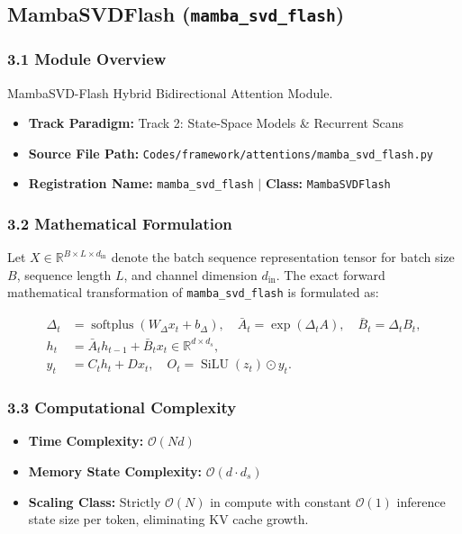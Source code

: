 \subsection{MambaSVDFlash (\texttt{mamba\_svd\_flash})}
\label{sec:app_module_mamba_svd_flash}

\subsubsection*{3.1 Module Overview}
MambaSVD-Flash Hybrid Bidirectional Attention Module.
\begin{itemize}
    \item \textbf{Track Paradigm:} Track 2: State-Space Models \& Recurrent Scans
    \item \textbf{Source File Path:} \texttt{Codes/framework/attentions/mamba\_svd\_flash.py}
    \item \textbf{Registration Name:} \texttt{mamba\_svd\_flash} $\mid$ \textbf{Class:} \texttt{MambaSVDFlash}
\end{itemize}

\subsubsection*{3.2 Mathematical Formulation}
Let $X \in \mathbb{R}^{B \times L \times d_{\text{in}}}$ denote the batch sequence representation tensor for batch size $B$, sequence length $L$, and channel dimension $d_{\text{in}}$. The exact forward mathematical transformation of \texttt{mamba\_svd\_flash} is formulated as:

\begin{align}
\Delta_t &= \operatorname{softplus}(W_\Delta x_t + b_\Delta), \quad \bar{A}_t = \exp(\Delta_t A), \quad \bar{B}_t = \Delta_t B_t, \\
h_t &= \bar{A}_t h_{t-1} + \bar{B}_t x_t \in \mathbb{R}^{d \times d_s}, \\
y_t &= C_t h_t + D x_t, \quad O_t = \operatorname{SiLU}(z_t) \odot y_t.
\end{align}


\subsubsection*{3.3 Computational Complexity}
\begin{itemize}
    \item \textbf{Time Complexity:} $\mathcal{O}(N d)$
    \item \textbf{Memory State Complexity:} $\mathcal{O}(d \cdot d_s)$
    \item \textbf{Scaling Class:} Strictly $\mathcal{O}(N)$ in compute with constant $\mathcal{O}(1)$ inference state size per token, eliminating KV cache growth.
\end{itemize}

